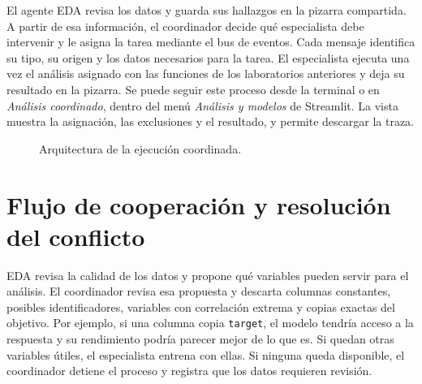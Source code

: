 \documentclass[11pt]{article}
\begin{document}
El agente EDA revisa los datos y guarda sus hallazgos en la pizarra compartida. A partir de esa información, el coordinador decide qué especialista debe intervenir y le asigna la tarea mediante el bus de eventos. Cada mensaje identifica su tipo, su origen y los datos necesarios para la tarea. El especialista ejecuta una vez el análisis asignado con las funciones de los laboratorios anteriores y deja su resultado en la pizarra. Se puede seguir este proceso desde la terminal o en \emph{Análisis coordinado}, dentro del menú \emph{Análisis y modelos} de Streamlit. La vista muestra la asignación, las exclusiones y el resultado, y permite descargar la traza.

\begin{figure}[htbp]
\centering
{}
\caption{Arquitectura de la ejecución coordinada.}
\end{figure}

\section{Flujo de cooperación y resolución del conflicto}

EDA revisa la calidad de los datos y propone qué variables pueden servir para el análisis. El coordinador revisa esa propuesta y descarta columnas constantes, posibles identificadores, variables con correlación extrema y copias exactas del objetivo. Por ejemplo, si una columna copia \texttt{target}, el modelo tendría acceso a la respuesta y su rendimiento podría parecer mejor de lo que es. Si quedan otras variables útiles, el especialista entrena con ellas. Si ninguna queda disponible, el coordinador detiene el proceso y registra que los datos requieren revisión.
\end{document}
